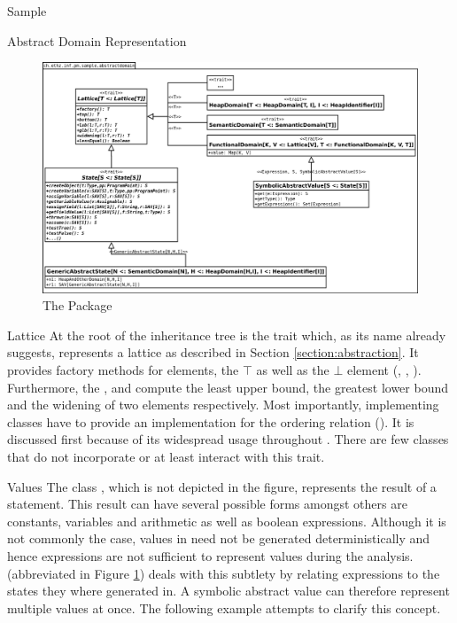 \begin{chapter}{Sample}
\begin{section}{Abstract Domain Representation}
		\begin{figure}
			\includegraphics[width=\textwidth]{Diagrams/abstractdomain.png}
			\caption{The  Package}
			\label{figure:abstractdomain}
		\end{figure}


		\begin{subsection}{Lattice}
			At the root of the inheritance tree is the  trait which, as its name already suggests, represents a lattice as described in Section \ref{section:abstraction}. It provides factory methods for elements, the $\top$ as well as the $\bot$ element (, , ). Furthermore, the ,  and  compute the least upper bound, the greatest lower bound and the widening of two elements respectively. Most importantly, implementing classes have to provide an implementation for the ordering relation (). It is discussed first because of its widespread usage throughout \sample. There are few classes that do not incorporate or at least interact with this trait.
		\end{subsection}


		\begin{subsection}{Values}
			The class , which is not depicted in the figure, represents the result of a statement. This result can have several possible forms amongst others are constants, variables and arithmetic as well as boolean expressions. Although it is not commonly the case, values in \sample need not be generated deterministically and hence expressions are not sufficient to represent values during the analysis.  (abbreviated  in Figure \ref{figure:abstractdomain}) deals with this subtlety by relating expressions to the states they where generated in. A symbolic abstract value can therefore represent multiple values at once. The following example attempts to clarify this concept.


\end{subsection}
\end{section}
\end{chapter}

